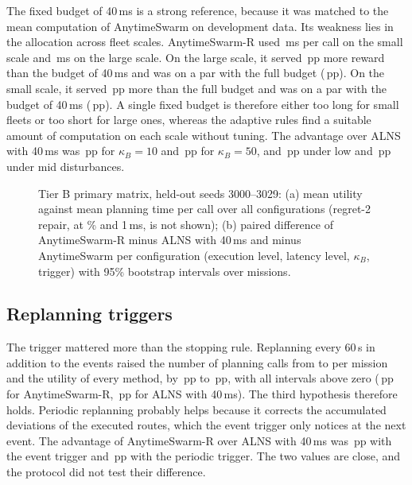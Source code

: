 The fixed budget of 40\,ms is a strong reference, because it was matched to the mean computation of AnytimeSwarm on
development data. Its weakness lies in the allocation across fleet scales. AnytimeSwarm-R used \,ms
per call on the small scale and \,ms on the large scale. On the large scale, it served
\,pp more reward than the budget of 40\,ms and was on a par with the full budget
(\,pp). On the small scale, it served \,pp more than the full budget and was on a
par with the budget of 40\,ms (\,pp). A single fixed budget is therefore either too long for
small fleets or too short for large ones, whereas the adaptive rules find a suitable amount of computation on each scale
without tuning. The advantage over ALNS with 40\,ms was \,pp for $\kappa_B=10$ and
\,pp for $\kappa_B=50$, and \,pp under low and \,pp under mid
disturbances.


\begin{figure}[t]
\centering
{}
\caption{Tier B primary matrix, held-out seeds 3000--3029: (a) mean utility against mean planning time per call over
all  configurations (regret-2 repair, at \% and 1\,ms, is not shown); (b) paired
difference of AnytimeSwarm-R minus ALNS with 40\,ms and minus AnytimeSwarm per configuration (execution level, latency
level, $\kappa_B$, trigger) with 95\% bootstrap intervals over  missions.}\label{fig:main}
\end{figure}

\subsection{Replanning triggers}\label{sec:res-triggers}
The trigger mattered more than the stopping rule. Replanning every 60\,s in addition to the events raised the number of
planning calls from  to  per mission and the utility of every method, by
\,pp to \,pp, with all intervals above zero (\,pp for AnytimeSwarm-R,
\,pp for ALNS with 40\,ms). The third hypothesis therefore holds. Periodic replanning probably helps
because it corrects the accumulated deviations of the executed routes, which the event trigger only notices at the next
event. The advantage of AnytimeSwarm-R over ALNS with 40\,ms was \,pp with the event trigger and
\,pp with the periodic trigger. The two values are close, and the protocol did not test their
difference.

